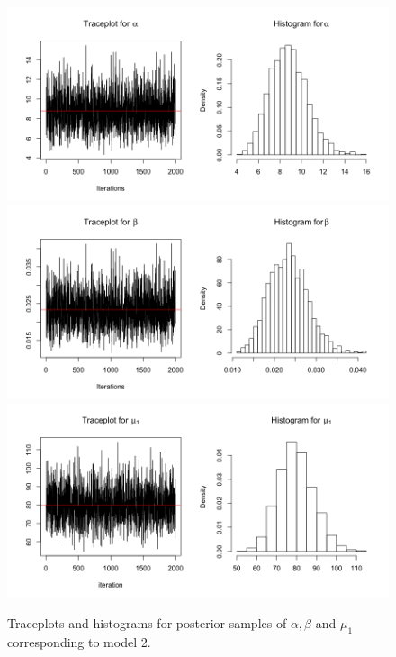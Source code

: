 \documentclass{asaproc}
\begin{document}
\begin{figure}
    \centering
    \includegraphics[scale = 0.5]{m2_alpha.png}\\
    \includegraphics[scale = 0.5]{m2_beta.png}\\
    \includegraphics[scale = 0.5]{m2_mu1.png}
    \caption{Traceplots and histograms for posterior samples of $\alpha, \beta$ and $\mu_1$ corresponding to model 2.}
    \label{m2alphabetamu1}
\end{figure}
\end{document}
